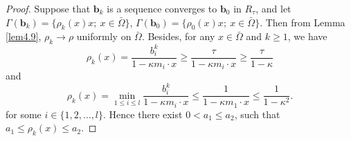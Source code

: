\documentclass[a4paper,12pt,]{article}
\numberwithin{equation}{section}
\numberwithin{equation}{section} \allowdisplaybreaks
\begin{document}
\begin{proof}
  Suppose that $\mathbf{b}_{k}$ is a sequence converges to $\mathbf{b}_{0}$ in $R_{\tau}$, and let $\Gamma(\mathbf{b}_{k}) = \{\rho_{k}(x)x;~x\in \bar{\Omega}\}$, $\Gamma(\mathbf{b}_{0}) = \{\rho_{0}(x)x;~x\in \bar{\Omega}\}$. Then from Lemma \ref{lem4.9}, $\rho_{k} \rightarrow \rho$ uniformly on $\bar{\Omega}$. Besides, for any $x\in \bar{\Omega}$ and $k \geq 1$, we have
  $$\rho_{k}(x) = \frac{b_{i}^{k}}{1 - \kappa m_{i} \cdot x} \geq \frac{\tau}{1 - \kappa m_{i} \cdot x} \geq \frac{\tau}{1 - \kappa}$$
  and
  $$\rho_{k}(x) = \min_{1 \leq i \leq l}\frac{b_{i}^{k}}{1 - \kappa m_{i} \cdot x} \leq \frac{1}{1 - \kappa m_{1} \cdot x} \leq\frac{1}{1 - \kappa^{2}}.$$
  for some $i \in \{1,2,\ldots,l\}$. Hence there exist $0 < a_{1} \leq a_{2}$, such that $ a_{1} \leq \rho_{k}(x) \leq  a_{2}$.


\end{proof}
\end{document}

